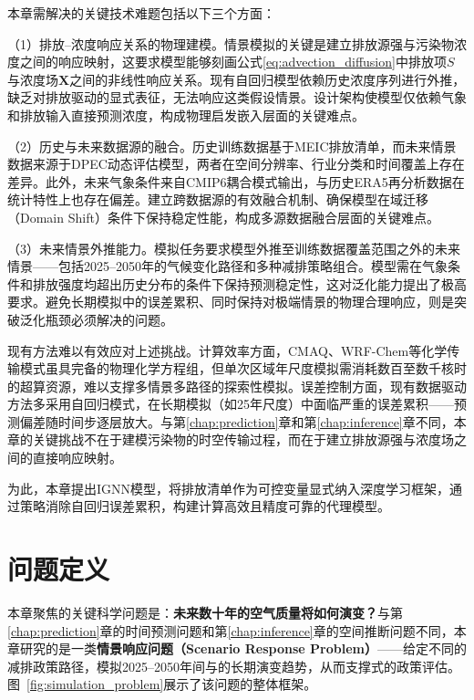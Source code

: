 本章需解决的关键技术难题包括以下三个方面：

（1）排放--浓度响应关系的物理建模。情景模拟的关键是建立排放源强与污染物浓度之间的响应映射，这要求模型能够刻画公式\eqref{eq:advection_diffusion}中排放项$S$与浓度场$\mathbf{X}$之间的非线性响应关系。现有自回归模型依赖历史浓度序列进行外推，缺乏对排放驱动的显式表征，无法响应这类假设情景。设计架构使模型仅依赖气象和排放输入直接预测浓度，构成物理启发嵌入层面的关键难点。

（2）历史与未来数据源的融合。历史训练数据基于MEIC排放清单，而未来情景数据来源于DPEC动态评估模型，两者在空间分辨率、行业分类和时间覆盖上存在差异\citep{zheng2018trends,cheng2021pathways}。此外，未来气象条件来自CMIP6耦合模式输出，与历史ERA5再分析数据在统计特性上也存在偏差。建立跨数据源的有效融合机制、确保模型在域迁移（Domain Shift）条件下保持稳定性能，构成多源数据融合层面的关键难点。

（3）未来情景外推能力。模拟任务要求模型外推至训练数据覆盖范围之外的未来情景——包括2025--2050年的气候变化路径和多种减排策略组合。模型需在气象条件和排放强度均超出历史分布的条件下保持预测稳定性，这对泛化能力提出了极高要求。避免长期模拟中的误差累积、同时保持对极端情景的物理合理响应，则是突破泛化瓶颈必须解决的问题。

现有方法难以有效应对上述挑战。计算效率方面，CMAQ、WRF-Chem等化学传输模式虽具完备的物理化学方程组，但单次区域年尺度模拟需消耗数百至数千核时的超算资源，难以支撑多情景多路径的探索性模拟。误差控制方面，现有数据驱动方法多采用自回归模式，在长期模拟（如25年尺度）中面临严重的误差累积——预测偏差随时间步逐层放大。与第\ref{chap:prediction}章和第\ref{chap:inference}章不同，本章的关键挑战不在于建模污染物的时空传输过程，而在于建立排放源强与浓度场之间的直接响应映射。

为此，本章提出IGNN模型，将排放清单作为可控变量显式纳入深度学习框架，通过策略消除自回归误差累积，构建计算高效且精度可靠的代理模型。


\section{问题定义}
\label{sec:sim_problem}

本章聚焦的关键科学问题是：\textbf{未来数十年的空气质量将如何演变？}与第\ref{chap:prediction}章的时间预测问题和第\ref{chap:inference}章的空间推断问题不同，本章研究的是一类\textbf{情景响应问题（Scenario Response Problem）}——给定不同的减排政策路径，模拟2025--2050年间\PM 与\ozone 的长期演变趋势，从而支撑式的政策评估。图~\ref{fig:simulation_problem}展示了该问题的整体框架。

